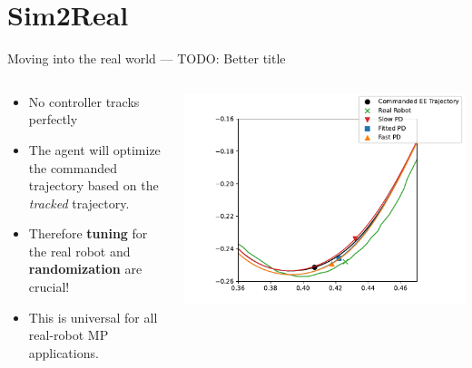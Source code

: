 \documentclass[16:9,en,navbarinfooter]{sdqbeamer}
\begin{document}
\section{Sim2Real}
\begin{frame}{Moving into the real world --- TODO: Better title}
\begin{columns}
    \begin{column}{0.5\textwidth}
        \begin{itemize}
                \item No controller tracks perfectly
                \item The agent will optimize the commanded trajectory based on the \textit{tracked} trajectory.
                \item Therefore \textbf{tuning} for the real robot and \textbf{randomization} are crucial!
                \item This is universal for all real-robot MP applications.
        \end{itemize}
    \end{column}
    \begin{column}{0.5\textwidth}
\includegraphics[width=\linewidth]{media/traj_error.pdf}
    \end{column}
\end{columns}

\end{frame}
\end{document}
